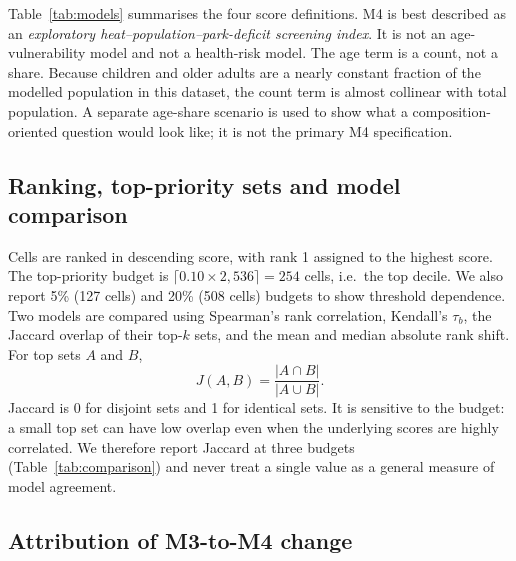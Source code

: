 \documentclass[times,twoside]{_Templates/MultiTargetManuscript}
\begin{document}
Table~\ref{tab:models} summarises the four score definitions.
M4 is best described as an \emph{exploratory heat--population--park-deficit
screening index}. It is not an age-vulnerability model and not a health-risk
model. The age term is a count, not a share. Because children and older adults
are a nearly constant fraction of the modelled population in this dataset, the
count term is almost collinear with total population. A separate age-share
scenario is used to show what a composition-oriented question would look like;
it is not the primary M4 specification.



\subsection{Ranking, top-priority sets and model comparison}

Cells are ranked in descending score, with rank 1 assigned to the highest score.
The top-priority budget is $\lceil 0.10 \times 2{,}536\rceil = 254$ cells, i.e.\
the top decile. We also report 5\% (127 cells) and 20\% (508 cells) budgets to
show threshold dependence. Two models are compared using Spearman's rank
correlation, Kendall's $\tau_b$, the Jaccard overlap of their top-$k$ sets,
and the mean and median absolute rank shift. For top sets $A$ and $B$,
\begin{equation}
J(A,B) = \frac{|A \cap B|}{|A \cup B|}.
\label{eq:jaccard}
\end{equation}
Jaccard is 0 for disjoint sets and 1 for identical sets. It is sensitive to the
budget: a small top set can have low overlap even when the underlying scores are
highly correlated. We therefore report Jaccard at three budgets
(Table~\ref{tab:comparison}) and never treat a single value as a general measure
of model agreement.

\subsection{Attribution of M3-to-M4 change}
\end{document}

